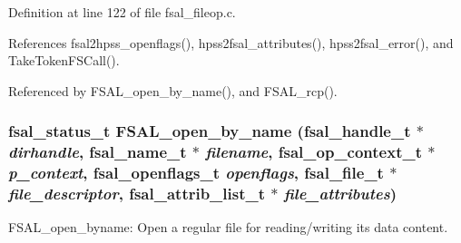 Definition at line 122 of file fsal\_\-fileop.c.

References fsal2hpss\_\-openflags(), hpss2fsal\_\-attributes(), hpss2fsal\_\-error(), and Take\-Token\-FSCall().

Referenced by FSAL\_\-open\_\-by\_\-name(), and FSAL\_\-rcp().
\subsubsection{\setlength{\rightskip}{0pt plus 5cm}fsal\_\-status\_\-t FSAL\_\-open\_\-by\_\-name (fsal\_\-handle\_\-t $\ast$ {\em dirhandle}, fsal\_\-name\_\-t $\ast$ {\em filename}, fsal\_\-op\_\-context\_\-t $\ast$ {\em p\_\-context}, fsal\_\-openflags\_\-t {\em openflags}, fsal\_\-file\_\-t $\ast$ {\em file\_\-descriptor}, fsal\_\-attrib\_\-list\_\-t $\ast$ {\em file\_\-attributes})}\label{fsal__fileop_8c_a0}


FSAL\_\-open\_\-byname: Open a regular file for reading/writing its data content.

